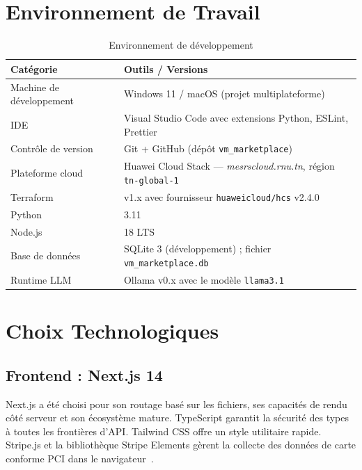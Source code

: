 \section{Environnement de Travail}

\begin{table}[H]
\centering
\caption{Environnement de développement}
\label{tab:env}
\begin{tabularx}{\linewidth}{lX}
\toprule
\textbf{Catégorie} & \textbf{Outils / Versions} \\
\midrule
Machine de développement & Windows 11 / macOS (projet multiplateforme) \\
IDE & Visual Studio Code avec extensions Python, ESLint, Prettier \\
Contrôle de version & Git + GitHub (dépôt \texttt{vm\_marketplace}) \\
Plateforme cloud & Huawei Cloud Stack --- \textit{mesrscloud.rnu.tn}, région \texttt{tn-global-1} \\
Terraform & v1.x avec fournisseur \texttt{huaweicloud/hcs} v2.4.0 \\
Python & 3.11 \\
Node.js & 18 LTS \\
Base de données & SQLite 3 (développement) ; fichier \texttt{vm\_marketplace.db} \\
Runtime LLM & Ollama v0.x avec le modèle \texttt{llama3.1} \\
\bottomrule
\end{tabularx}
\end{table}

\section{Choix Technologiques}

\subsection{Frontend : Next.js 14}

Next.js a été choisi pour son routage basé sur les fichiers, ses capacités de
rendu côté serveur et son écosystème mature. TypeScript garantit la sécurité des
types à toutes les frontières d'API. Tailwind CSS offre un style utilitaire rapide.
Stripe.js et la bibliothèque Stripe Elements gèrent la collecte des données de carte
conforme PCI dans le navigateur~\cite{nextjs_docs, tailwind_docs}.

